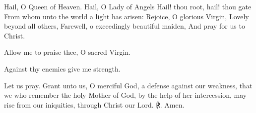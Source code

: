 \begin{enpars}\noindent Hail, O Queen of Heaven.
Hail, O Lady of Angels
Hail! thou root, hail! thou gate
From whom unto the world a light has arisen:
Rejoice, O glorious Virgin,
Lovely beyond all others,
Farewell, o exceedingly beautiful maiden,
And pray for us to Christ.

\noindent \vv Allow me to praise thee, O sacred Virgin.

\noindent \rr Against thy enemies give me strength.

\noindent Let us pray. Grant unto us, O merciful God, a defense against our weakness, that we who remember the holy Mother of God, by the help of her intercession, may rise from our iniquities, through Christ our Lord. ℟. Amen.
\end{enpars}